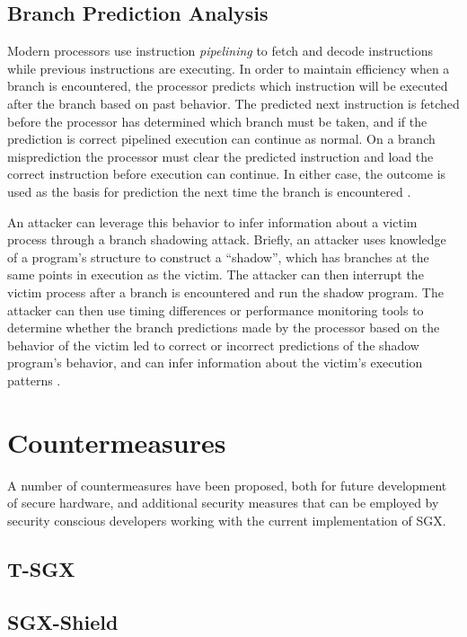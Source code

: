 \subsection{Branch Prediction Analysis}

Modern processors use instruction \emph{pipelining} to fetch and decode instructions while previous instructions are executing. In order to maintain efficiency when a branch is encountered, the processor predicts which instruction will be executed after the branch based on past behavior. The predicted next instruction is fetched before the processor has determined which branch must be taken, and if the prediction is correct pipelined execution can continue as normal. On a branch misprediction the processor must clear the predicted instruction and load the correct instruction before execution can continue. In either case, the outcome is used as the basis for prediction the next time the branch is encountered \cite{aciicmez_power_2007, lee_inferring_2017}. 

An attacker can leverage this behavior to infer information about a victim process through a branch shadowing attack. Briefly, an attacker uses knowledge of a program's structure to construct a ``shadow'', which has branches at the same points in execution as the victim. The attacker can then interrupt the victim process after a branch is encountered and run the shadow program. The attacker can then use timing differences or performance monitoring tools to determine whether the branch predictions made by the processor based on the behavior of the victim led to correct or incorrect predictions of the shadow program's behavior, and can infer information about the victim's execution patterns \cite{lee_inferring_2017}.

\section{Countermeasures}

A number of countermeasures have been proposed, both for future development of secure hardware, and additional security measures that can be employed by security conscious developers working with the current implementation of SGX.

\subsection{T-SGX}

\subsection{SGX-Shield}


